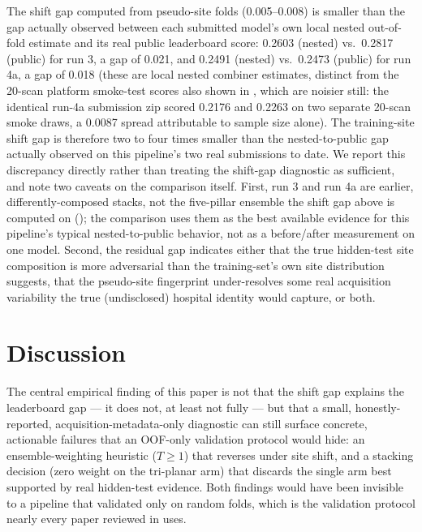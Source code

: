 \documentclass[11pt]{article}
\begin{document}
The shift gap computed from pseudo-site folds (0.005--0.008) is smaller than the gap actually observed between each submitted model's own local nested out-of-fold estimate and its real public leaderboard score: 0.2603 (nested) vs.\ 0.2817 (public) for run 3, a gap of 0.021, and 0.2491 (nested) vs.\ 0.2473 (public) for run 4a, a gap of 0.018 (these are local nested combiner estimates, distinct from the 20-scan platform smoke-test scores also shown in , which are noisier still: the identical run-4a submission zip scored 0.2176 and 0.2263 on two separate 20-scan smoke draws, a 0.0087 spread attributable to sample size alone). The training-site shift gap is therefore two to four times smaller than the nested-to-public gap actually observed on this pipeline's two real submissions to date. We report this discrepancy directly rather than treating the shift-gap diagnostic as sufficient, and note two caveats on the comparison itself. First, run 3 and run 4a are earlier, differently-composed stacks, not the five-pillar ensemble the shift gap above is computed on (); the comparison uses them as the best available evidence for this pipeline's typical nested-to-public behavior, not as a before/after measurement on one model. Second, the residual gap indicates either that the true hidden-test site composition is more adversarial than the training-set's own site distribution suggests, that the pseudo-site fingerprint under-resolves some real acquisition variability the true (undisclosed) hospital identity would capture, or both.

\section{Discussion}
\label{sec:discussion}

The central empirical finding of this paper is not that the shift gap explains the leaderboard gap --- it does not, at least not fully --- but that a small, honestly-reported, acquisition-metadata-only diagnostic can still surface concrete, actionable failures that an OOF-only validation protocol would hide: an ensemble-weighting heuristic ($T \geq 1$) that reverses under site shift, and a stacking decision (zero weight on the tri-planar arm) that discards the single arm best supported by real hidden-test evidence. Both findings would have been invisible to a pipeline that validated only on random folds, which is the validation protocol nearly every paper reviewed in  uses.
\end{document}
